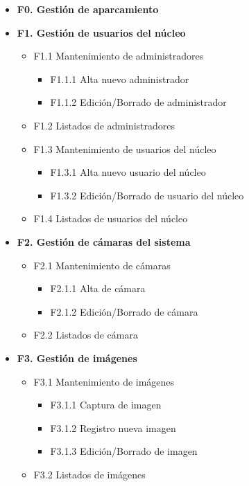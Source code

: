 \documentclass[12pt,a4paper]{article}
\begin{document}
	\begin{itemize}
		\item \textbf{F0. Gestión de aparcamiento}
		\item \textbf{F1. Gestión de usuarios del núcleo}
		\begin{itemize}
			\item F1.1 Mantenimiento de administradores
			\begin{itemize}
				\item F1.1.1 Alta nuevo administrador
				\item F1.1.2 Edición/Borrado de administrador
			\end{itemize}
			\item F1.2 Listados de administradores
			\item F1.3 Mantenimiento de usuarios del núcleo
			\begin{itemize}
				\item F1.3.1 Alta nuevo usuario del núcleo
				\item F1.3.2 Edición/Borrado de usuario del núcleo
			\end{itemize}
			\item F1.4 Listados de usuarios del núcleo
		\end{itemize}
		\item \textbf{F2. Gestión de cámaras del sistema}
		\begin{itemize}
			\item F2.1 Mantenimiento de cámaras
			\begin{itemize}
				\item F2.1.1 Alta de cámara
				\item F2.1.2 Edición/Borrado de cámara
			\end{itemize}
			\item F2.2 Listados de cámara
		\end{itemize}
		\item \textbf{F3. Gestión de imágenes}
		\begin{itemize}
			\item F3.1 Mantenimiento de imágenes
			\begin{itemize}
				\item F3.1.1 Captura de imagen
				\item F3.1.2 Registro nueva imagen
				\item F3.1.3 Edición/Borrado de imagen
			\end{itemize}
			\item F3.2 Listados de imágenes
		\end{itemize}

\end{itemize}
\end{document}

